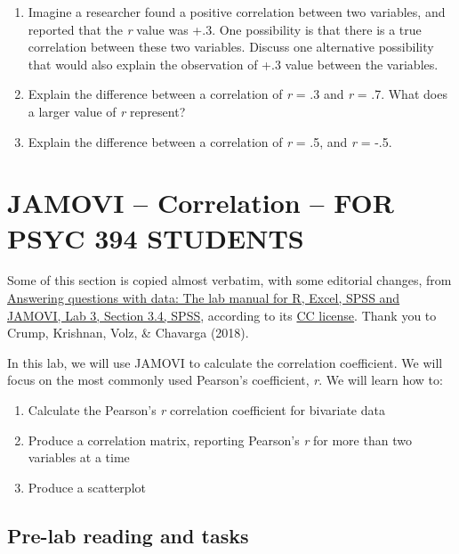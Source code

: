 \documentclass[
]{book}
\providecommand{\tightlist}{%
  \setlength{\itemsep}{0pt}\setlength{\parskip}{0pt}}
\begin{document}
\begin{enumerate}
\def\labelenumi{\arabic{enumi}.}
\setcounter{enumi}{6}
\item
  Imagine a researcher found a positive correlation between two variables, and reported that the \emph{r} value was +.3. One possibility is that there is a true correlation between these two variables. Discuss one alternative possibility that would also explain the observation of +.3 value between the variables.
\item
  Explain the difference between a correlation of \emph{r} = .3 and \emph{r} = .7. What does a larger value of \emph{r} represent?
\item
  Explain the difference between a correlation of \emph{r} = .5, and \emph{r} = -.5.
\end{enumerate}

\hypertarget{jamovi-correlation-for-psyc-394-students}{%
\section{JAMOVI -- Correlation -- FOR PSYC 394 STUDENTS}\label{jamovi-correlation-for-psyc-394-students}}

Some of this section is copied almost verbatim, with some editorial changes, from \href{https://www.crumplab.com/statisticsLab/lab-3-correlation.html\#spss-3}{Answering questions with data: The lab manual for R, Excel, SPSS and JAMOVI, Lab 3, Section 3.4, SPSS}, according to its \href{https://creativecommons.org/licenses/by-sa/4.0/deed.ast}{CC license}. Thank you to Crump, Krishnan, Volz, \& Chavarga (2018).

In this lab, we will use JAMOVI to calculate the correlation coefficient. We will focus on the most commonly used Pearson's coefficient, \emph{r}. We will learn how to:

\begin{enumerate}
\def\labelenumi{\arabic{enumi}.}
\tightlist
\item
  Calculate the Pearson's \emph{r} correlation coefficient for bivariate data
\item
  Produce a correlation matrix, reporting Pearson's \emph{r} for more than two variables at a time
\item
  Produce a scatterplot
\end{enumerate}

\hypertarget{pre-lab-reading-and-tasks-2}{%
\subsection{Pre-lab reading and tasks}\label{pre-lab-reading-and-tasks-2}}
\end{document}
